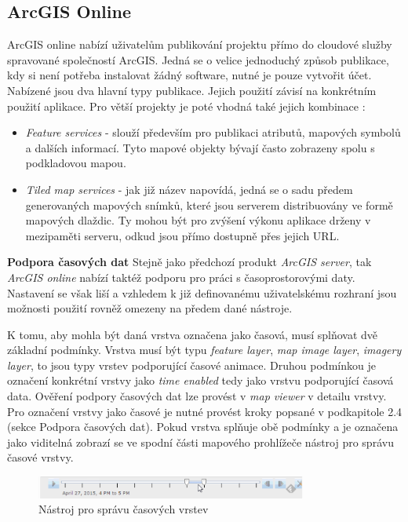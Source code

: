 \subsection{ArcGIS Online}

ArcGIS online nabízí uživatelům publikování projektu přímo do cloudové
služby spravované společností ArcGIS. Jedná se o velice jednoduchý
způsob publikace, kdy si není potřeba instalovat žádný software, nutné
je pouze vytvořit účet. Nabízené jsou dva hlavní typy
publikace. Jejich použití závisí na konkrétním použití aplikace. Pro
větší projekty je poté vhodná také jejich kombinace
\cite{arcgis-publishing-service}:
\begin{itemize}
	\item \textit{Feature services} - slouží především pro
publikaci atributů, mapových symbolů a dalších informací. Tyto mapové
objekty bývají často zobrazeny spolu s podkladovou mapou.
	\item \textit{Tiled map services} - jak již název napovídá,
jedná se o sadu předem generovaných mapových snímků, které jsou
serverem distribuovány ve formě mapových dlaždic. Ty mohou být pro
zvýšení výkonu aplikace drženy v mezipaměti serveru, odkud jsou přímo
dostupně přes jejich URL.
\end{itemize}

\bigskip
\noindent \textbf{Podpora časových dat} Stejně jako předchozí produkt
\textit{ArcGIS server}, tak \textit{ArcGIS online} nabízí taktéž
podporu pro práci s časoprostorovými daty. Nastavení se však liší a
vzhledem k již definovanému uživatelskému rozhraní jsou možnosti
použití rovněž omezeny na předem dané nástroje.

K tomu, aby mohla být daná vrstva označena jako časová, musí splňovat
dvě základní podmínky. Vrstva musí být typu \textit{feature layer},
\textit{map image layer}, \textit{imagery layer}, to jsou typy vrstev
podporující časové animace. Druhou podmínkou je označení konkrétní
vrstvy jako \textit{time enabled} tedy jako vrstvu podporující časová
data. Ověření podpory časových dat lze provést v \textit{map viewer} v
detailu vrstvy. Pro označení vrstvy jako časové je nutné provést kroky
popsané v podkapitole 2.4 (sekce Podpora časových dat). Pokud vrstva
splňuje obě podmínky a je označena jako viditelná zobrazí se ve spodní
části mapového prohlížeče nástroj pro správu časové vrstvy.

\begin{figure}[h!]  \centering
\includegraphics[width=0.8\textwidth]{../img/arcgis-online-time-slider.png}
	\caption{Nástroj pro správu časových vrstev}
	\label{fig:arcgis-time-slider}
\end{figure}

